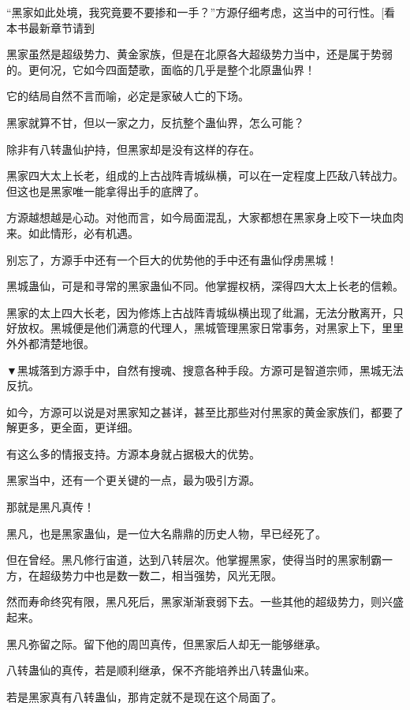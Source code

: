 
\begin{this_body}

“黑家如此处境，我究竟要不要掺和一手？”方源仔细考虑，这当中的可行性。[看本书最新章节请到

黑家虽然是超级势力、黄金家族，但是在北原各大超级势力当中，还是属于势弱的。更何况，它如今四面楚歌，面临的几乎是整个北原蛊仙界！

它的结局自然不言而喻，必定是家破人亡的下场。

黑家就算不甘，但以一家之力，反抗整个蛊仙界，怎么可能？

除非有八转蛊仙护持，但黑家却是没有这样的存在。

黑家四大太上长老，组成的上古战阵青城纵横，可以在一定程度上匹敌八转战力。但这也是黑家唯一能拿得出手的底牌了。

方源越想越是心动。对他而言，如今局面混乱，大家都想在黑家身上咬下一块血肉来。如此情形，必有机遇。

别忘了，方源手中还有一个巨大的优势他的手中还有蛊仙俘虏黑城！

黑城蛊仙，可是和寻常的黑家蛊仙不同。他掌握权柄，深得四大太上长老的信赖。

黑家的太上四大长老，因为修炼上古战阵青城纵横出现了纰漏，无法分散离开，只好放权。黑城便是他们满意的代理人，黑城管理黑家日常事务，对黑家上下，里里外外都清楚地很。

▼黑城落到方源手中，自然有搜魂、搜意各种手段。方源可是智道宗师，黑城无法反抗。

如今，方源可以说是对黑家知之甚详，甚至比那些对付黑家的黄金家族们，都要了解更多，更全面，更详细。

有这么多的情报支持。方源本身就占据极大的优势。

黑家当中，还有一个更关键的一点，最为吸引方源。

那就是黑凡真传！

黑凡，也是黑家蛊仙，是一位大名鼎鼎的历史人物，早已经死了。

但在曾经。黑凡修行宙道，达到八转层次。他掌握黑家，使得当时的黑家制霸一方，在超级势力中也是数一数二，相当强势，风光无限。

然而寿命终究有限，黑凡死后，黑家渐渐衰弱下去。一些其他的超级势力，则兴盛起来。

黑凡弥留之际。留下他的周凹真传，但黑家后人却无一能够继承。

八转蛊仙的真传，若是顺利继承，保不齐能培养出八转蛊仙来。

若是黑家真有八转蛊仙，那肯定就不是现在这个局面了。


\end{this_body}
